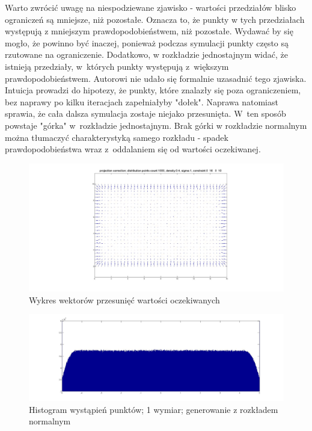 \documentclass{mini}
\begin{document}
Warto zwrócić uwagę na niespodziewane zjawisko - wartości przedziałów blisko ograniczeń są mniejsze, niż pozostałe. Oznacza to, że punkty w tych przedziałach występują z mniejszym prawdopodobieństwem, niż pozostałe. Wydawać by się mogło, że powinno być inaczej, ponieważ podczas symulacji punkty często są rzutowane na ograniczenie. Dodatkowo, w rozkładzie jednostajnym widać, że istnieją przedziały, w~których punkty występują z~większym prawdopodobieństwem. Autorowi nie udało się formalnie uzasadnić tego zjawiska. Intuicja prowadzi do hipotezy, że punkty, które znalazły się poza ograniczeniem, bez naprawy po kilku iteracjach zapełniałyby "dołek". Naprawa natomiast sprawia, że cała dalsza symulacja zostaje niejako przesunięta. W~ten sposób powstaje "górka" w~rozkładzie jednostajnym. Brak górki w rozkładzie normalnym można tłumaczyć charakterystyką samego rozkładu - spadek prawdopodobieństwa wraz z~oddalaniem się od wartości oczekiwanej.

\begin{figure}[H]
\centering
\includegraphics[width=\textwidth]{projection2dprzesuniecie}
\caption{Wykres wektorów przesunięć wartości oczekiwanych}
\end{figure}

\begin{figure}[H]
\centering
\includegraphics[width=\textwidth]{p_n_50M_1__5_5}
\caption{Histogram wystąpień punktów; 1 wymiar; generowanie z rozkładem normalnym}
\label{bladzenie:rzutowanie1dn}
\end{figure}
\end{document}
